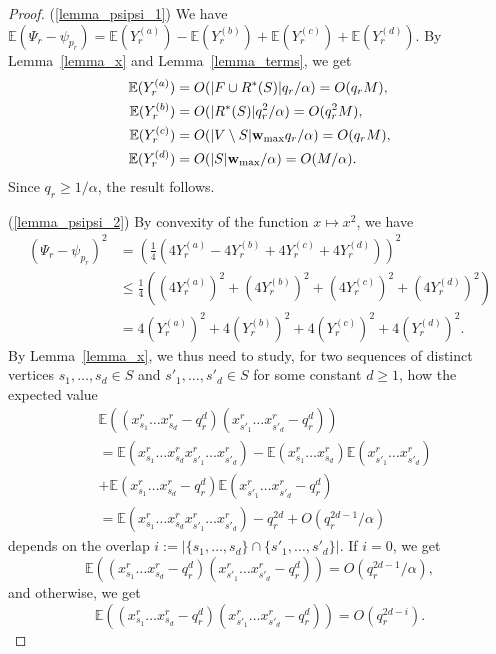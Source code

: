 \documentclass{article}
\theoremstyle{plain}
\theoremstyle{remark}
\theoremstyle{plain}
\numberwithin{equation}{section}
\renewcommand{\b}{{\bf{w}}}
\begin{document}
	\begin{proof}
		(\ref{lemma_psipsi_1}) We have $\mathbb{E}(\Psi_r-\psi_{p_r})=\mathbb{E}(Y_r^{(a)})-\mathbb{E}(Y_r^{(b)})+\mathbb{E}(Y_r^{(c)})+\mathbb{E}(Y_r^{(d)})$. By Lemma~\ref{lemma_x} and Lemma~\ref{lemma_terms}, we get
		\begin{align}
			\mathbb{E}(Y_r^{(a)})&=O(|F\cup R^*(S)|q_r/\alpha)=O(q_rM),
			\\\mathbb{E}(Y_r^{(b)})&=O(|R^*(S)|q_r^2/\alpha)=O(q_r^2M),
			\\\mathbb{E}(Y_r^{(c)})&=O(|V\setminus S|\b_{\max}q_r/\alpha)=O(q_rM),
			\\\mathbb{E}(Y_r^{(d)})&=O(|S|\b_{\max}/\alpha)=O(M/\alpha).
		\end{align}
		Since $q_r\geq1/\alpha$, the result follows.
		
		(\ref{lemma_psipsi_2}) By convexity of the function $x\mapsto x^2$, we have
		\begin{align}
			(\Psi_r-\psi_{p_r})^2&=(\tfrac14(4Y_r^{(a)}-4Y_r^{(b)}+4Y_r^{(c)}+4Y_r^{(d)}))^2
			\\&\leq\tfrac14((4Y_r^{(a)})^2+(4Y_r^{(b)})^2+(4Y_r^{(c)})^2+(4Y_r^{(d)})^2)
			\\&=4(Y_r^{(a)})^2+4(Y_r^{(b)})^2+4(Y_r^{(c)})^2+4(Y_r^{(d)})^2.
		\end{align}
		By Lemma~\ref{lemma_x}, we thus need to study, for two sequences of distinct vertices $s_1,\ldots,s_d\in S$ and $s'_1,\ldots,s'_d\in S$ for some constant $d\geq1$, how the expected value
		\begin{align}
			&\mathbb{E}((x_{s_1}^r\ldots x_{s_d}^r-q_r^d)(x_{s'_1}^r\ldots x_{s'_d}^r-q_r^d))
			\\&=\mathbb{E}(x_{s_1}^r\ldots x_{s_d}^rx_{s'_1}^r\ldots x_{s'_d}^r)-\mathbb{E}(x_{s_1}^r\ldots x_{s_d}^r)\mathbb{E}(x_{s'_1}^r\ldots x_{s'_d}^r)
			\\&+\mathbb{E}(x_{s_1}^r\ldots x_{s_d}^r-q_r^d)\mathbb{E}(x_{s'_1}^r\ldots x_{s'_d}^r-q_r^d)
			\\&=\mathbb{E}(x_{s_1}^r\ldots x_{s_d}^rx_{s'_1}^r\ldots x_{s'_d}^r)-q_r^{2d}+O(q_r^{2d-1}/\alpha)
		\end{align}
		depends on the overlap $i:=|\{s_1,\ldots,s_d\}\cap\{s'_1,\ldots,s'_d\}|$. If $i=0$, we get $$\mathbb{E}((x_{s_1}^r\ldots x_{s_d}^r-q_r^d)(x_{s'_1}^r\ldots x_{s'_d}^r-q_r^d))=O(q_r^{2d-1}/\alpha),$$ and otherwise, we get $$\mathbb{E}((x_{s_1}^r\ldots x_{s_d}^r-q_r^d)(x_{s'_1}^r\ldots x_{s'_d}^r-q_r^d))=O(q_r^{2d-i}).$$
		

\end{proof}
\end{document}
